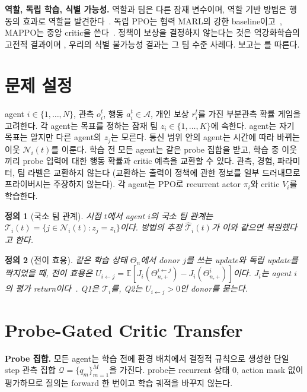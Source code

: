 \documentclass[twocolumn,10pt]{article}
\newtheorem{definition}{정의}
\theoremstyle{remark}
\begin{document}
\textbf{역할, 독립 학습, 식별 가능성.} 역할과 팀은 다른 잠재 변수이며, 역할 기반 방법은 행동의 효과로 역할을 발견한다~\cite{wang2021rode}. 독립 PPO는 협력 MARL의 강한
baseline이고~\cite{schulman2017ppo,dewitt2020ippo}, MAPPO는 중앙 critic을 쓴다~\cite{yu2022mappo}. 정책이 보상을 결정하지 않는다는 것은 역강화학습의 고전적 결과이며
\cite{ng2000irl}, 우리의 식별 불가능성 결과는 그 팀 수준 사례다. 보고는 \cite{agarwal2021precipice}를 따른다.

\section{문제 설정}
\label{sec:setting}
agent $i\in\{1,\dots,N\}$, 관측 $o_i^t$, 행동 $a_i^t\in\mathcal{A}$, 개인 보상 $r_i^t$를 가진 부분관측 확률 게임을 고려한다. 각 agent는 목표를 정하는 잠재 팀
$z_i\in\{1,\dots,K\}$에 속한다. agent는 자기 목표는 알지만 다른 agent의 $z_j$는 모른다. 통신 범위 안의 agent는 시간에 따라 바뀌는 이웃 $\mathcal{N}_i(t)$를 이룬다.
학습 전 모든 agent는 같은 probe 집합을 받고, 학습 중 이웃끼리 probe 입력에 대한 행동 확률과 critic 예측을 교환할 수 있다. 관측, 경험, 파라미터, 팀 라벨은 교환하지 않는다
(교환하는 출력이 정책에 관한 정보를 일부 드러내므로 프라이버시는 주장하지 않는다). 각 agent는 PPO로 recurrent actor $\pi_i$와 critic $V_i$를 학습한다.

\begin{definition}[국소 팀 관계]
시점 $t$에서 agent $i$의 국소 팀 관계는 $\mathcal{T}_i(t)=\{j\in\mathcal{N}_i(t): z_j=z_i\}$이다. 방법의 추정 $\hat{\mathcal{T}}_i(t)$가 이와 같으면 복원했다고 한다.
\end{definition}

\begin{definition}[전이 효용]
같은 학습 상태 $\Theta_n$에서 donor $j$를 쓰는 update와 독립 update를 짝지었을 때, 전이 효용은
$U_{i\leftarrow j}=\mathbb{E}[J_i(\Theta^{i\leftarrow j}_{n,+})-J_i(\Theta^{i}_{n,+})]$이다. $J_i$는 agent $i$의 평가 return이다~\cite{agarwal2021precipice}.
Q1은 $\mathcal{T}_i$를, Q2는 $U_{i\leftarrow j}>0$인 donor를 묻는다.
\end{definition}

\section{Probe-Gated Critic Transfer}
\label{sec:method}
\textbf{Probe 집합.} 모든 agent는 학습 전에 환경 배치에서 결정적 규칙으로 생성한 단일 step 관측 집합 $\mathcal{Q}=\{q_m\}_{m=1}^{M}$을 가진다. probe는 recurrent 상태 0,
action mask 없이 평가하므로 질의는 forward 한 번이고 학습 궤적을 바꾸지 않는다.
\end{document}
